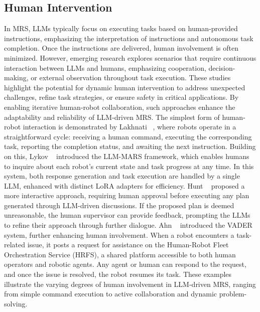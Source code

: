 \subsection{Human Intervention}
In MRS, LLMs typically focus on executing tasks based on human-provided instructions, emphasizing the interpretation of instructions and autonomous task completion. Once the instructions are delivered, human involvement is often minimized. However, emerging research explores scenarios that require continuous interaction between LLMs and humans, emphasizing cooperation, decision-making, or external observation throughout task execution. These studies highlight the potential for dynamic human intervention to address unexpected challenges, refine task strategies, or ensure safety in critical applications. By enabling iterative human-robot collaboration, such approaches enhance the adaptability and reliability of LLM-driven MRS.
The simplest form of human-robot interaction is demonstrated by Lakhnati \etal~\cite{lakhnati_exploring_2024}, where robots operate in a straightforward cycle: receiving a human command, executing the corresponding task, reporting the completion status, and awaiting the next instruction.
Building on this, Lykov \etal~\cite{lykov_llm-mars_2023} introduced the LLM-MARS framework, which enables humans to inquire about each robot's current state and task progress at any time. In this system, both response generation and task execution are handled by a single LLM, enhanced with distinct LoRA adapters for efficiency.
Hunt \etal~\cite{hunt2024conversational} proposed a more interactive approach, requiring human approval before executing any plan generated through LLM-driven discussions. If the proposed plan is deemed unreasonable, the human supervisor can provide feedback, prompting the LLMs to refine their approach through further dialogue.
Ahn \etal~\cite{ahn_vader_2024} introduced the VADER system, further enhancing human involvement. When a robot encounters a task-related issue, it posts a request for assistance on the Human-Robot Fleet Orchestration Service (HRFS), a shared platform accessible to both human operators and robotic agents. Any agent or human can respond to the request, and once the issue is resolved, the robot resumes its task.
These examples illustrate the varying degrees of human involvement in LLM-driven MRS, ranging from simple command execution to active collaboration and dynamic problem-solving.

